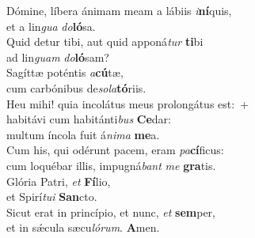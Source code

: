 \evenverse Dómine, líbera ánimam meam a lábiis \textit{i}\textbf{ní}quis,~\*\\
\evenverse et a lin\textit{gua} \textit{do}\textbf{ló}sa.\\
\oddverse Quid detur tibi, aut quid apponá\textit{tur} \textbf{ti}bi~\*\\
\oddverse ad lin\textit{guam} \textit{do}\textbf{ló}sam?\\
\evenverse Sagíttæ poténtis \textit{a}\textbf{cú}tæ,~\*\\
\evenverse cum carbónibus de\textit{so}\textit{la}\textbf{tó}riis.\\
\oddverse Heu mihi! quia incolátus meus prolongátus est:~+\\
\oddverse  habitávi cum habitánti\textit{bus} \textbf{Ce}dar:~\*\\
\oddverse multum íncola fuit á\textit{ni}\textit{ma} \textbf{me}a.\\
\evenverse Cum his, qui odérunt pacem, eram \textit{pa}\textbf{cí}ficus:~\*\\
\evenverse cum loquébar illis, impugná\textit{bant} \textit{me} \textbf{gra}tis.\\
\oddverse Glória Patri, \textit{et} \textbf{Fí}lio,~\*\\
\oddverse et Spirí\textit{tu}\textit{i} \textbf{San}cto.\\
\evenverse Sicut erat in princípio, et nunc, \textit{et} \textbf{sem}per,~\*\\
\evenverse et in sǽcula sæcu\textit{ló}\textit{rum}. \textbf{A}men.\\
